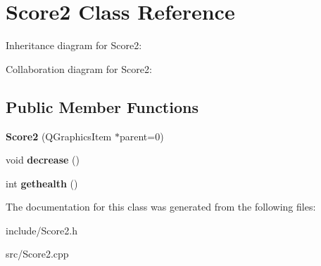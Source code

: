 \hypertarget{classScore2}{}\section{Score2 Class Reference}
\label{classScore2}


Inheritance diagram for Score2\+:


Collaboration diagram for Score2\+:
\subsection*{Public Member Functions}
\begin{DoxyCompactItemize}
\item 
\mbox{\label{classScore2_adb3e13c79f0fa34b2f32499d656c9393}} 
{\bfseries Score2} (Q\+Graphics\+Item $\ast$parent=0)
\item 
\mbox{\label{classScore2_adfcb73e9b0b361d538506106c5b3bb40}} 
void {\bfseries decrease} ()
\item 
\mbox{\label{classScore2_ac3090dbe909904e1e3e745d41d314a1c}} 
int {\bfseries gethealth} ()
\end{DoxyCompactItemize}


The documentation for this class was generated from the following files\+:\begin{DoxyCompactItemize}
\item 
include/Score2.\+h\item 
src/Score2.\+cpp\end{DoxyCompactItemize}
